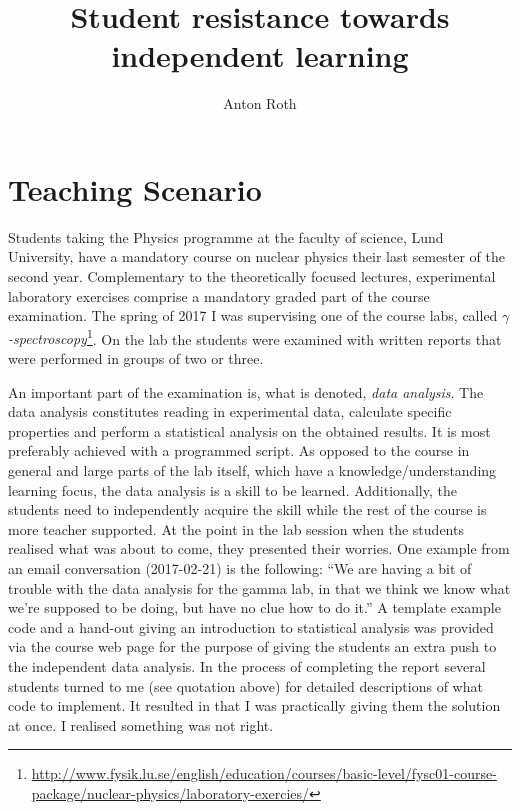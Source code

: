 \documentclass[]{article}
\title{Student resistance towards independent learning}
\author{Anton Roth}
\begin{document}

\section*{Teaching Scenario}
Students taking the Physics programme at the faculty of science, Lund University, have a mandatory course on nuclear physics their last semester of the second year.
Complementary to the theoretically focused lectures, experimental laboratory exercises comprise a mandatory graded part of the course examination.
The spring of 2017 I was supervising one of the course labs, called {\it $\gamma$-spectroscopy}\footnote{\url{http://www.fysik.lu.se/english/education/courses/basic-level/fysc01-course-package/nuclear-physics/laboratory-exercies/}}.
On the lab the students were examined with written reports that were performed in groups of two or three.

An important part of the examination is, what is denoted, {\it data analysis}.
The data analysis constitutes reading in experimental data, calculate specific properties and perform a statistical analysis on the obtained results.
It is most preferably achieved with a programmed script.
As opposed to the course in general and large parts of the lab itself, which have a knowledge/understanding learning focus, the data analysis is a skill to be learned.
Additionally, the students need to independently acquire the skill while the rest of the course is more teacher supported.
At the point in the lab session when the students realised what was about to come, they presented their worries.
One example from an email conversation (2017-02-21) is the following: ``We are having a bit of trouble with the data analysis for the gamma lab, in that we think we know what we're supposed to be doing, but have no clue how to do it.''
A template example code and a hand-out giving an introduction to statistical analysis was provided via the course web page for the purpose of giving the students an extra push to the independent data analysis.
In the process of completing the report several students turned to me (see quotation above) for detailed descriptions of what code to implement.
It resulted in that I was practically giving them the solution at once.
I realised something was not right.
\end{document}
